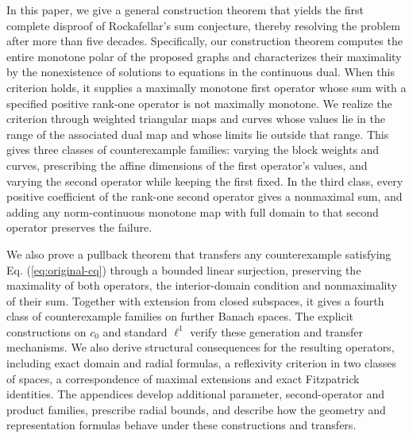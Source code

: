 \documentclass[11pt]{article}
\theoremstyle{definition}
\theoremstyle{remark}
\begin{document}




In this paper, we give a general construction theorem that yields the first complete disproof of Rockafellar's sum conjecture, thereby resolving the problem after more than five decades. 
Specifically, our construction theorem computes the entire monotone polar of the proposed graphs and characterizes their maximality by the nonexistence of solutions to equations in the continuous dual. When this criterion holds, it supplies a maximally monotone first operator whose sum with a specified positive rank-one operator is not maximally monotone. We realize the criterion through weighted triangular maps and curves whose values lie in the range of the associated dual map and whose limits lie outside that range. This gives three classes of counterexample families: varying the block weights and curves, prescribing the affine dimensions of the first operator's values, and varying the second operator while keeping the first fixed. In the third class, every positive coefficient of the rank-one second operator gives a nonmaximal sum, and adding any norm-continuous monotone map with full domain to that second operator preserves the failure.

We also prove a pullback theorem that transfers any counterexample satisfying Eq. (\ref{eq:original-cq}) through a bounded linear surjection, preserving the maximality of both operators, the interior-domain condition and nonmaximality of their sum. Together with extension from closed subspaces, it gives a fourth class of counterexample families on further Banach spaces. The explicit constructions on $c_0$ and standard $\ell^1$ verify these generation and transfer mechanisms. We also derive structural consequences for the resulting operators, including exact domain and radial formulas, a reflexivity criterion in two classes of spaces, a correspondence of maximal extensions and exact Fitzpatrick identities. The appendices develop additional parameter, second-operator and product families, prescribe radial bounds, and describe how the geometry and representation formulas behave under these constructions and transfers.
\end{document}
